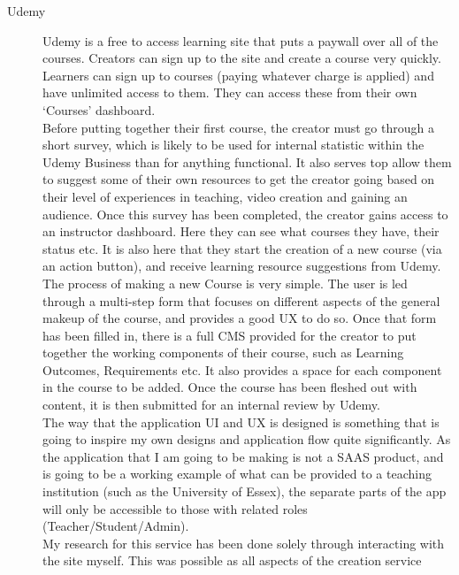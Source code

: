 \documentclass[12pt, a4paper,twoside]{report}
\theoremstyle{plain} %
\theoremstyle{definition} %
\numberwithin{equation}{chapter}
\begin{document}
\begin{description}
    \item[Udemy] {
        Udemy is a free to access learning site that puts a paywall over all of
        the courses. Creators can sign up to the site and create a course very
        quickly. Learners can sign up to courses (paying whatever charge is
        applied) and have unlimited access to them. They can access these from
        their own `Courses' dashboard.\\
        Before putting together their first course, the creator must go through
        a short survey, which is likely to be used for internal statistic within
        the Udemy Business than for anything functional. It also serves top allow
        them to suggest some of their own resources to get the creator going based
        on their level of experiences in teaching, video creation and gaining an
        audience. Once this survey has been completed, the creator gains access
        to an instructor dashboard. Here they can see what courses they have,
        their status etc. It is also here that they start the creation of a new
        course (via an action button), and receive learning resource suggestions
        from Udemy.\\
        The process of making a new Course is very simple. The user is led through
        a multi-step form that focuses on different aspects of the general makeup
        of the course, and provides a good UX to do so. Once that form has been
        filled in, there is a full CMS provided for the creator to put together
        the working components of their course, such as Learning Outcomes,
        Requirements etc. It also provides a space for each component in the course
        to be added. Once the course has been fleshed out with content, it is then
        submitted for an internal review by Udemy.\\
        The way that the application UI and UX is designed is something that is
        going to inspire my own designs and application flow quite significantly.
        As the application that I am going to be making is not a SAAS product, and
        is going to be a working example of what can be provided to a teaching
        institution (such as the University of Essex), the separate parts of the
        app will only be accessible to those with related roles
        (Teacher/Student/Admin).\\
        My research for this service has been done solely through interacting with
        the site myself. This was possible as all aspects of the creation service
}
\end{description}
\end{document}
